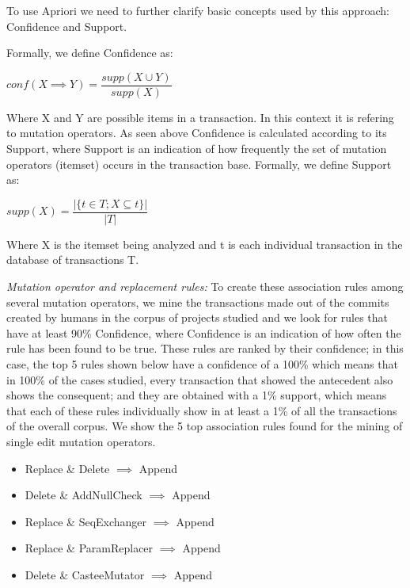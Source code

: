 \documentclass[conference]{IEEEtran}
\begin{document}
To use Apriori we need to further clarify basic concepts used by this approach: Confidence and Support.

Formally, we define Confidence as:

\begin{center}
$conf(X \implies Y) = \dfrac{supp(X \cup Y)}{supp(X)}$ 
\end{center}

Where X and Y are possible items in a transaction. In this context it is refering to mutation operators. As seen above Confidence is calculated according to its Support, where Support is an indication of how frequently the set of mutation operators (itemset) occurs in the transaction base.
Formally, we define Support as:

\begin{center}
$supp(X) = \dfrac{|\{t \in T; X \subseteq t\}|}{|T|}$
\end{center}

Where X is the itemset being analyzed and t is each individual transaction in the database of transactions T. 

\emph{Mutation operator and replacement rules:}
To create these association rules among several mutation operators, we mine the
transactions made out of the commits created by humans in the corpus of projects
studied and we look for rules that have at least 90\% Confidence, where
Confidence is an indication of how often the rule has been found to be true.  
These rules are ranked by their confidence; in this case, the top 5 rules shown
below have a confidence of a 100\% which means that in 100\% of the cases
studied, every transaction that showed the antecedent also shows the consequent;
and they are obtained with a 1\% support, which means that each of these rules
individually show in at least a 1\% of all the transactions of the overall
corpus. We show the 5  top association rules found for the mining of single edit
mutation operators. 


\begin{itemize}
\item Replace \& Delete $\implies$ Append
\item Delete \& AddNullCheck $\implies$ Append
\item Replace \& SeqExchanger $\implies$ Append
\item Replace \& ParamReplacer $\implies$ Append
\item Delete \& CasteeMutator $\implies$ Append
\end{itemize}
\end{document}
